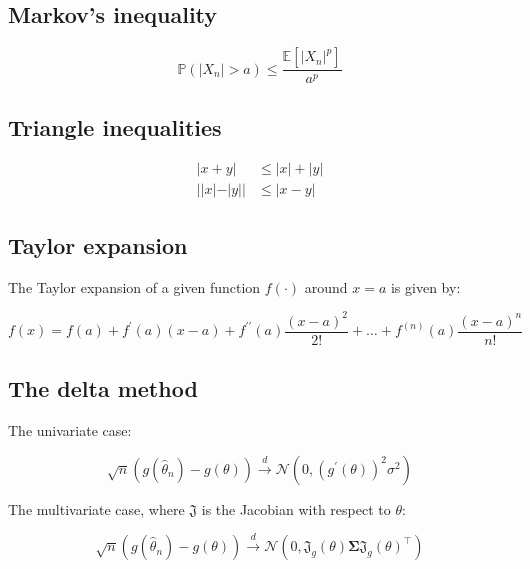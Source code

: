 \documentclass{report}
\begin{document}
\subsection{Markov's inequality}

\begin{equation}\label{eq:lst-markovs-inequality}
    \mathbb{P}(|X_n| > a) \le \frac{\mathbb{E}\left[|X_n|^p\right]}{a^p}
\end{equation}

\subsection{Triangle inequalities}

\begin{equation}\label{eq:lst-triangle-inequalities}
    \begin{aligned}
      | x + y| &\le |x| + |y| \\
      ||x| - |y|| &\le |x - y|
    \end{aligned}
\end{equation}

\subsection{Taylor expansion}

The Taylor expansion of a given function $f(\cdot)$ around $x = a$ is given by:

\begin{equation}\label{eq:lst-taylor-expansion}
    f(x) = f(a) + f^\prime(a)(x - a) + f^{\prime\prime}(a) \frac{(x - a)^2}{2!} + \dots + f^{(n)}(a) \frac{(x - a)^n}{n!}
\end{equation}

\subsection{The delta method}

The univariate case:

\begin{equation}\label{eq:lst-delta-method-univariate}
    \sqrt{n}\left(g\left(\hat{\theta}_n\right) - g(\theta)\right) \overset{d}{\to} \mathcal{N}\left(0, (g^\prime(\theta))^2\sigma^2\right)
\end{equation}

The multivariate case, where $\mathfrak{J}$ is the Jacobian with respect to $\theta$:

\begin{equation}\label{eq:lst-delta-method-multivariate}
    \sqrt{n}\left(g\left(\hat{\theta}_n\right) - g(\theta)\right) \overset{d}{\to} \mathcal{N}\left(0, \mathfrak{J}_g(\theta)\symbf{\Sigma}\mathfrak{J}_g(\theta)^\intercal\right)
\end{equation}
\end{document}
